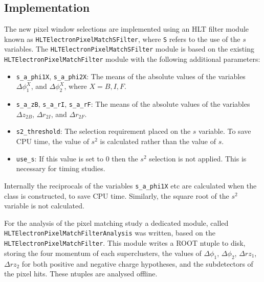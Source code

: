 \subsection{Implementation}

The new pixel window selections are implemented using an HLT filter module known as \texttt{HLTElectronPixelMatchSFilter}, where \texttt{S} refers to the use of the $s$ variables.  The \texttt{HLTElectronPixelMatchSFilter} module is based on the existing \texttt{HLTElectronPixelMatchFilter} module with the following additional parameters:

\begin{itemize}
  \item \texttt{s\_a\_phi1X}, \texttt{s\_a\_phi2X}: The means of the absolute values of the variables $\Delta\phi_1^X$, and $\Delta\phi_2^X$, where $X=B,I,F$.
  \item \texttt{s\_a\_zB}, \texttt{s\_a\_rI}, \texttt{s\_a\_rF}: The means of the absolute values of the variables $\Delta z_{2B}$, $\Delta r_{2I}$, and $\Delta r_{2F}$.
  \item \texttt{s2\_threshold}: The selection requirement placed on the $s$ variable.  To save CPU time, the value of $s^2$ is calculated rather than the value of $s$.
  \item \texttt{use\_s}: If this value is set to $0$ then the $s^2$ selection is not applied.  This is necessary for timing studies.
\end{itemize}

Internally the reciprocals of the variables \texttt{s\_a\_phi1X} etc are calculated when the class is constructed, to save CPU time.  Similarly, the square root of the $s^2$ variable is not calculated.

For the analysis of the pixel matching study a dedicated module, called \texttt{HLTElectronPixelMatchFilterAnalysis} was written, based on the \texttt{HLTElectronPixelMatchFilter}.  This module writes a ROOT ntuple to disk, storing the four momentum of each superclusters, the values of $\Delta\phi_1$, $\Delta\phi_2$, $\Delta rz_1$, $\Delta rz_2$ for both positive and negative charge hypotheses, and the subdetectors of the pixel hits.  These ntuples are analysed offline.
